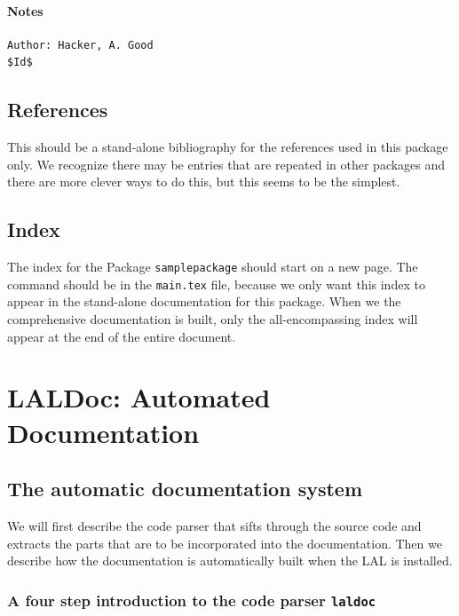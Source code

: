 \documentclass[oneside]{book}
\begin{document}
\subsection*{Notes}


\vfill{\footnotesize{
\vspace{-1ex}
\mbox{}
\vspace{-3ex}
\begin{verbatim}
Author: Hacker, A. Good
$Id$
\end{verbatim}
}}


\chapter*{References}

This should be a stand-alone bibliography for the references used in
this package only.  We recognize there may be entries that are
repeated in other packages and there are more clever ways to do this,
but this seems to be the simplest.

\chapter*{Index}
The index for the Package {\tt samplepackage} should start on a new
page.  The \verb@\printindex@ command should be in the {\tt main.tex}
file, because we only want this index to appear in the stand-alone
documentation for this package.  When we the comprehensive
documentation is built, only the all-encompassing index will appear
at the end of the entire document.

\part{LALDoc: Automated Documentation}

\chapter{The automatic documentation system}
\label{c:laldoc}

We will first describe the code parser that sifts through the source
code and extracts the parts that are to be incorporated into the
documentation. Then we describe how the documentation is automatically
built when the LAL is installed.

\section{A four step introduction to the code parser {\texttt {laldoc}}}
\end{document}
